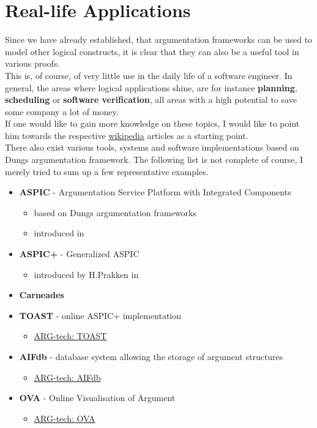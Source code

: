 \documentclass[12pt]{report}
\numberwithin{figure}{chapter}
\theoremstyle{break}
\begin{document}
\section{Real-life Applications}
Since we have already established, that argumentation frameworks can be used to model other logical constructs, it is clear that they can also be a useful tool in various proofs.\\
This is, of course, of very little use in the daily life of a software engineer. In general, the areas where logical applications shine, are for instance \textbf{planning},
\textbf{scheduling} or \textbf{software verification}, all areas with a high potential to save some company a lot of money.\\
If one would like to gain more knowledge on these topics, I would like to point him towards the respective \href{http://en.wikipedia.org/}{wikipedia} articles as a starting point.\\
\medskip
There also exist various tools, systems and software implementations based on Dungs argumentation framework.
The following list is not complete of course, I merely tried to sum up a few representative examples.
\begin{itemize}
	\item{\textbf{ASPIC} - Argumentation Service Platform with Integrated Components}
	\begin{itemize}
		\item{based on Dungs argumentation frameworks}
		\item{introduced in \cite{ASPIC}}
	\end{itemize}
	\item{\textbf{ASPIC+} - Generalized ASPIC}
	\begin{itemize}
		\item{introduced by H.Prakken in \cite{ASPIC+}}
	\end{itemize}
	\item{\textbf{Carneades}}
	\item{\textbf{TOAST} - online ASPIC+ implementation}
	\begin{itemize}
		\item{\href{http://toast.arg-tech.org/snaith-reed-comma12.pdf}{ARG-tech: TOAST}}
	\end{itemize}
	\item{\textbf{AIFdb} - database system allowing the storage of argument structures}
	\begin{itemize}
		\item{\href{http://www.arg-tech.org/index.php/projects/aifbdb-user-guide/}{ARG-tech: AIFdb}}
	\end{itemize}
	\item{\textbf{OVA} - Online Visualisation of Argument}
	\begin{itemize}
		\item{\href{http://www.arg-tech.org/index.php/projects/ova}{ARG-tech: OVA}}
	\end{itemize}
\end{itemize}
\end{document}
